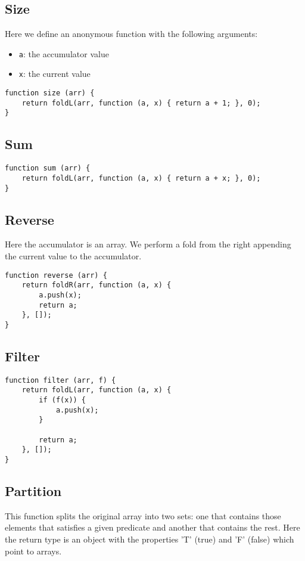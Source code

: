 \documentclass[12pt]{article}
\begin{document}
\newpage

\subsection*{Size}
Here we define an anonymous function with the following arguments:
\begin{itemize}
	\item \verb|a|: the accumulator value
	\item \verb|x|: the current value
\end{itemize}

\medskip
\begin{lstlisting}
function size (arr) {
	return foldL(arr, function (a, x) { return a + 1; }, 0);	
}
\end{lstlisting}

\subsection*{Sum}
\medskip
\begin{lstlisting}
function sum (arr) {
	return foldL(arr, function (a, x) { return a + x; }, 0);	
}
\end{lstlisting}

\subsection*{Reverse}
Here the accumulator is an array. We perform a fold from the right appending the current value
to the accumulator.

\medskip
\begin{lstlisting}
function reverse (arr) {
	return foldR(arr, function (a, x) {
		a.push(x);
		return a;
	}, []);
}
\end{lstlisting}


\subsection*{Filter}
\medskip
\begin{lstlisting}
function filter (arr, f) {
	return foldL(arr, function (a, x) {
		if (f(x)) {
			a.push(x);
		}

		return a;
	}, []);
}
\end{lstlisting}

\subsection*{Partition}
This function splits the original array into two sets: one that contains those elements that
satisfies a given predicate and another that contains the rest. Here the return
type is an object with the properties 'T' (true) and 'F' (false) which point to arrays.
\end{document}
